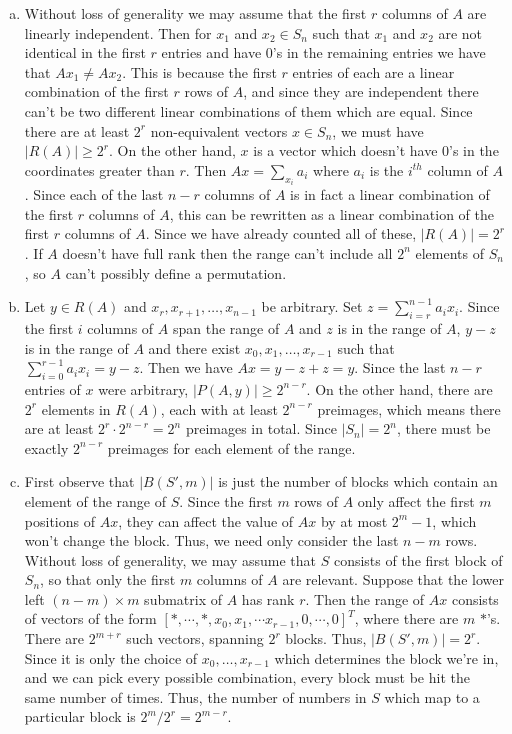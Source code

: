 \documentclass{article}
\begin{document}
\begin{enumerate}[a.]
\item Without loss of generality we may assume that the first $r$ columns of $A$ are linearly independent.  Then for $x_1$ and $x_2 \in S_n$ such that $x_1$ and $x_2$ are not identical in the first $r$ entries and have 0's in the remaining entries we have that $Ax_1 \neq Ax_2$.  This is because the first $r$ entries of each are a linear combination of the first $r$ rows of $A$, and since they are independent there can't be two different linear combinations of them which are equal.  Since there are at least $2^r$ non-equivalent vectors $x \in S_n$, we must have $|R(A)| \geq 2^r$.  On the other hand, $x$ is a vector which doesn't have 0's in the coordinates greater than $r$.  Then $Ax = \sum_{x_i}a_i$ where $a_i$ is the $i^{th}$ column of $A$.  Since each of the last $n - r$ columns of $A$ is in fact a linear combination of the first $r$ columns of $A$, this can be rewritten as a linear combination of the first $r$ columns of $A$.  Since we have already counted all of these, $|R(A)| = 2^r$.  If $A$ doesn't have full rank then the range can't include all $2^n$ elements of $S_n$, so $A$ can't possibly define a permutation.

\item Let $y \in R(A)$ and $x_r, x_{r+1}, \ldots, x_{n-1}$ be arbitrary.  Set $z = \sum_{i=r}^{n-1} a_ix_i$.  Since the first $i$ columns of $A$ span the range of $A$ and $z$ is in the range of $A$, $y-z$ is in the range of $A$ and there exist $x_0, x_1, \ldots, x_{r-1}$ such that $\sum_{i=0}^{r-1}a_ix_i = y-z$.  Then we have $Ax = y-z+z=y$.  Since the last $n-r$ entries of $x$ were arbitrary, $|P(A,y)| \geq 2^{n-r}$. On the other hand, there are $2^r$ elements in $R(A)$, each with at least $2^{n-r}$ preimages, which means there are at least $2^r \cdot 2^{n-r} = 2^n$ preimages in total.  Since $|S_n| = 2^n$, there must be exactly $2^{n-r}$ preimages for each element of the range. 

\item First observe that $|B(S',m)|$ is just the number of blocks which contain an element of the range of $S$.  Since the first $m$ rows of $A$ only affect the first $m$ positions of $Ax$, they can affect the value of $Ax$ by at most $2^m-1$, which won't change the block.  Thus, we need only consider the last $n-m$ rows.  Without loss of generality, we may assume that $S$ consists of the first block of $S_n$, so that only the first $m$ columns of $A$ are relevant.  Suppose that the lower left $(n-m) \times m$ submatrix of $A$ has rank $r$.  Then the range of $Ax$ consists of vectors of the form $ [*, \cdots, *, x_0, x_1, \cdots x_{r-1}, 0, \cdots, 0]^T$, where there are $m$ $*$'s. There are $2^{m+r}$ such vectors, spanning $2^r$ blocks. Thus, $|B(S',m)| = 2^r$.  Since it is only the choice of $x_0, \ldots, x_{r-1}$ which determines the block we're in, and we can pick every possible combination, every block must be hit the same number of times.  Thus, the number of numbers in $S$ which map to a particular block is $2^m/2^r = 2^{m-r}$.



\end{enumerate}
\end{document}
